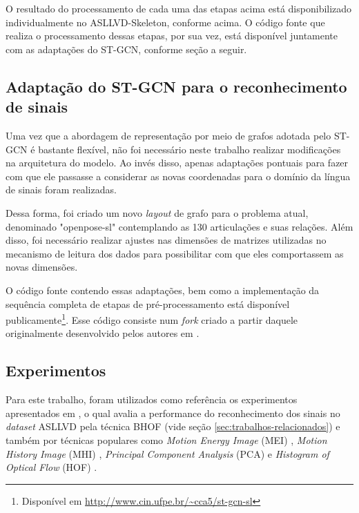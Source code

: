 O resultado do processamento de cada uma das etapas acima está disponibilizado individualmente no ASLLVD-Skeleton, conforme acima. O código fonte que realiza o processamento dessas etapas, por sua vez, está disponível juntamente com as adaptações do ST-GCN, conforme seção a seguir.


\subsection{Adaptação do ST-GCN para o reconhecimento de sinais} %
\label{sec:adaptacao-st-gcn}

Uma vez que a abordagem de representação por meio de grafos adotada pelo ST-GCN é bastante flexível, não foi necessário neste trabalho realizar modificações na arquitetura do modelo. Ao invés disso, apenas adaptações pontuais para fazer com que ele passasse a considerar as novas coordenadas para o domínio da língua de sinais foram realizadas. 

Dessa forma, foi criado um novo \textit{layout} de grafo para o problema atual, denominado "openpose-sl" contemplando as 130 articulações e suas relações. Além disso, foi necessário realizar ajustes nas dimensões de matrizes utilizadas no mecanismo de leitura dos dados para possibilitar com que eles comportassem as novas dimensões.

O código fonte contendo essas adaptações, bem como a implementação da sequência completa de etapas de pré-processamento está disponível publicamente\footnote{
    Disponível em \url{http://www.cin.ufpe.br/~cca5/st-gcn-sl}
}. Esse código consiste num \textit{fork} criado a partir daquele originalmente desenvolvido pelos autores em \cite{st-gcn-2018}.



\subsection{Experimentos} %
\label{experimentos}

Para este trabalho, foram utilizados como referência os experimentos apresentados em \cite{lim-2016}, o qual avalia a performance do reconhecimento dos sinais no \textit{dataset} ASLLVD pela técnica BHOF (vide seção \ref{sec:trabalhos-relacionados}) e também por técnicas populares como \textit{Motion Energy Image} (MEI) \cite{athitsos-asllvd-2008}, \textit{Motion History Image} (MHI) \cite{babu-2004}, \textit{Principal Component Analysis} (PCA) \cite{dreuw-2012} e \textit{Histogram of Optical Flow} (HOF) \cite{laptev-2008}. 

